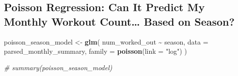 \documentclass[
  11pt,
]{article}
\newenvironment{Shaded}{\begin{snugshade}}{\end{snugshade}}
\newcommand{\AttributeTok}[1]{\textcolor[rgb]{0.13,0.29,0.53}{#1}}
\newcommand{\CommentTok}[1]{\textcolor[rgb]{0.56,0.35,0.01}{\textit{#1}}}
\newcommand{\FunctionTok}[1]{\textcolor[rgb]{0.13,0.29,0.53}{\textbf{#1}}}
\newcommand{\NormalTok}[1]{#1}
\newcommand{\OtherTok}[1]{\textcolor[rgb]{0.56,0.35,0.01}{#1}}
\newcommand{\SpecialCharTok}[1]{\textcolor[rgb]{0.81,0.36,0.00}{\textbf{#1}}}
\newcommand{\StringTok}[1]{\textcolor[rgb]{0.31,0.60,0.02}{#1}}
\begin{document}
\subsection{Poisson Regression: Can It Predict My Monthly Workout
Count\ldots{} Based on
Season?}\label{poisson-regression-can-it-predict-my-monthly-workout-count-based-on-season}

\begin{Shaded}
\begin{Highlighting}[]
\NormalTok{poisson\_season\_model }\OtherTok{\textless{}{-}} \FunctionTok{glm}\NormalTok{(}
\NormalTok{  num\_worked\_out }\SpecialCharTok{\textasciitilde{}}\NormalTok{ season,}
  \AttributeTok{data =}\NormalTok{ parsed\_monthly\_summary,}
  \AttributeTok{family =} \FunctionTok{poisson}\NormalTok{(}\AttributeTok{link =} \StringTok{"log"}\NormalTok{)}
\NormalTok{)}

\CommentTok{\# summary(poisson\_season\_model)}
\end{Highlighting}
\end{Shaded}
\end{document}
